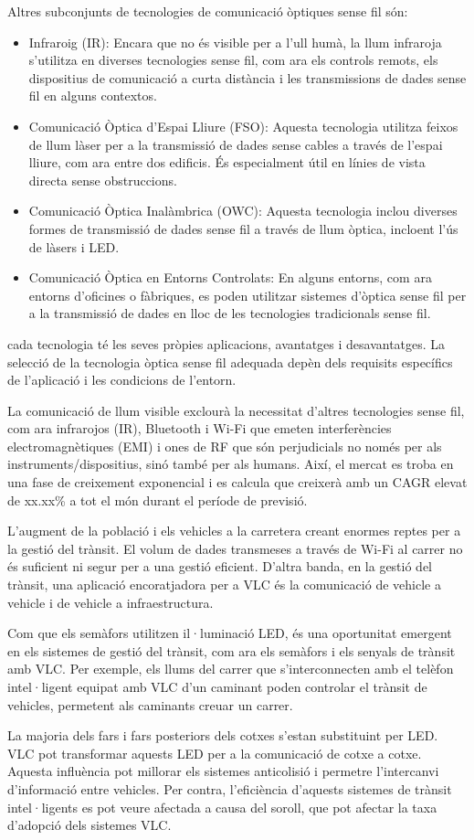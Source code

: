 Altres subconjunts de tecnologies de comunicació òptiques sense fil són:
\begin{itemize}
    \item Infraroig (IR): Encara que no és visible per a l'ull humà, la llum infraroja s'utilitza en diverses tecnologies sense fil, com ara els controls remots, els dispositius de comunicació a curta distància i les transmissions de dades sense fil en alguns contextos.
    \item Comunicació Òptica d'Espai Lliure (FSO): Aquesta tecnologia utilitza feixos de llum làser per a la transmissió de dades sense cables a través de l'espai lliure, com ara entre dos edificis. És especialment útil en línies de vista directa sense obstruccions.
    \item Comunicació Òptica Inalàmbrica (OWC): Aquesta tecnologia inclou diverses formes de transmissió de dades sense fil a través de llum òptica, incloent l'ús de làsers i LED.
    \item Comunicació Òptica en Entorns Controlats: En alguns entorns, com ara entorns d'oficines o fàbriques, es poden utilitzar sistemes d'òptica sense fil per a la transmissió de dades en lloc de les tecnologies tradicionals sense fil.
\end{itemize}

cada tecnologia té les seves pròpies aplicacions, avantatges i desavantatges. La selecció de la tecnologia òptica sense fil adequada depèn dels requisits específics de l'aplicació i les condicions de l'entorn.


La comunicació de llum visible exclourà la necessitat d'altres tecnologies sense fil, com ara infrarojos (IR), Bluetooth i Wi-Fi que emeten interferències electromagnètiques (EMI) i ones de RF que són perjudicials no només per als instruments/dispositius, sinó també per als humans. Així, el mercat es troba en una fase de creixement exponencial i es calcula que creixerà amb un CAGR elevat de xx.xx\% a tot el món durant el període de previsió.


L'augment de la població i els vehicles a la carretera creant enormes reptes per a la gestió del trànsit. El volum de dades transmeses a través de Wi-Fi al carrer no és suficient ni segur per a una gestió eficient. D'altra banda, en la gestió del trànsit, una aplicació encoratjadora per a VLC és la comunicació de vehicle a vehicle i de vehicle a infraestructura.

Com que els semàfors utilitzen il·luminació LED, és una oportunitat emergent en els sistemes de gestió del trànsit, com ara els semàfors i els senyals de trànsit amb VLC. Per exemple, els llums del carrer que s'interconnecten amb el telèfon intel·ligent equipat amb VLC d'un caminant poden controlar el trànsit de vehicles, permetent als caminants creuar un carrer.

La majoria dels fars i fars posteriors dels cotxes s'estan substituint per LED. VLC pot transformar aquests LED per a la comunicació de cotxe a cotxe. Aquesta influència pot millorar els sistemes anticolisió i permetre l'intercanvi d'informació entre vehicles. Per contra, l'eficiència d'aquests sistemes de trànsit intel·ligents es pot veure afectada a causa del soroll, que pot afectar la taxa d'adopció dels sistemes VLC.


